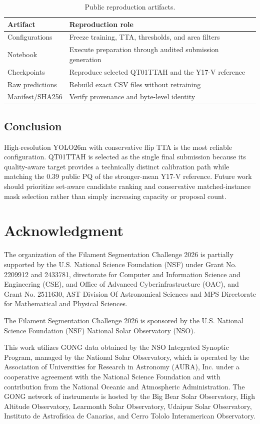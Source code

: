 \documentclass[sigconf]{acmart}
\begin{document}
\begin{table}[!h]
\centering
\caption{Public reproduction artifacts.}
\label{tab:artifacts}
\small
\begin{tabularx}{\columnwidth}{lX}
\toprule
Artifact & Reproduction role \\
\midrule
Configurations & Freeze training, TTA, thresholds, and area filters \\
Notebook & Execute preparation through audited submission generation \\
Checkpoints & Reproduce selected QT01TTAH and the Y17-V reference \\
Raw predictions & Rebuild exact CSV files without retraining \\
Manifest/SHA256 & Verify provenance and byte-level identity \\
\bottomrule
\end{tabularx}
\end{table}

\subsection{Conclusion}
High-resolution YOLO26m with conservative flip TTA is the most reliable configuration.
QT01TTAH is selected as the single final submission because its quality-aware target provides a
technically distinct calibration path while matching the 0.39 public PQ of the stronger-mean Y17-V
reference. Future work should prioritize set-aware candidate ranking and conservative matched-instance
mask selection rather than simply increasing capacity or proposal count.

\section{Acknowledgment}\label{sec:acknowledgment}
The organization of the Filament Segmentation Challenge 2026 is partially supported by the U.S.
National Science Foundation (NSF) under Grant No. 2209912 and 2433781, directorate for Computer and
Information Science and Engineering (CSE), and Office of Advanced Cyberinfrastructure (OAC), and
Grant No. 2511630, AST Division Of Astronomical Sciences and MPS Directorate for Mathematical and
Physical Sciences.

The Filament Segmentation Challenge 2026 is sponsored by the U.S. National Science Foundation
(NSF) National Solar Observatory (NSO).

This work utilizes GONG data obtained by the NSO Integrated Synoptic Program, managed by the
National Solar Observatory, which is operated by the Association of Universities for Research in
Astronomy (AURA), Inc. under a cooperative agreement with the National Science Foundation and with
contribution from the National Oceanic and Atmospheric Administration. The GONG network of
instruments is hosted by the Big Bear Solar Observatory, High Altitude Observatory, Learmonth Solar
Observatory, Udaipur Solar Observatory, Instituto de Astrof\'isica de Canarias, and Cerro Tololo
Interamerican Observatory.



\end{document}
